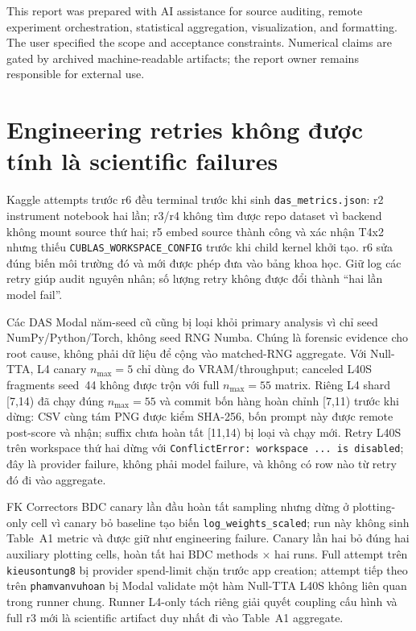 \documentclass[11pt,a4paper]{article}
\newcommand{\code}[1]{\texttt{#1}}
\begin{document}
This report was prepared with AI assistance for source auditing, remote experiment orchestration, statistical aggregation, visualization, and formatting. The user specified the scope and acceptance constraints. Numerical claims are gated by archived machine-readable artifacts; the report owner remains responsible for external use.

\appendix
\section{Engineering retries không được tính là scientific failures}

Kaggle attempts trước r6 đều terminal trước khi sinh \code{das\_metrics.json}: r2 instrument notebook hai lần; r3/r4 không tìm được repo dataset vì backend không mount source thứ hai; r5 embed source thành công và xác nhận T4x2 nhưng thiếu \code{CUBLAS\_WORKSPACE\_CONFIG} trước khi child kernel khởi tạo. r6 sửa đúng biến môi trường đó và mới được phép đưa vào bảng khoa học. Giữ log các retry giúp audit nguyên nhân; số lượng retry không được đổi thành ``hai lần model fail''.

Các DAS Modal năm-seed cũ cũng bị loại khỏi primary analysis vì chỉ seed NumPy/Python/Torch, không seed RNG Numba. Chúng là forensic evidence cho root cause, không phải dữ liệu để cộng vào matched-RNG aggregate. Với Null-TTA, L4 canary $n_{\max}=5$ chỉ dùng đo VRAM/throughput; canceled L40S fragments seed~44 không được trộn với full $n_{\max}=55$ matrix. Riêng L4 shard [7,14) đã chạy đúng $n_{\max}=55$ và commit bốn hàng hoàn chỉnh [7,11) trước khi dừng: CSV cùng tám PNG được kiểm SHA-256, bốn prompt này được remote post-score và nhận; suffix chưa hoàn tất [11,14) bị loại và chạy mới. Retry L40S trên workspace thứ hai dừng với \code{ConflictError: workspace ... is disabled}; đây là provider failure, không phải model failure, và không có row nào từ retry đó đi vào aggregate.

FK Correctors BDC canary lần đầu hoàn tất sampling nhưng dừng ở plotting-only cell vì canary bỏ baseline tạo biến \code{log\_weights\_scaled}; run này không sinh Table~A1 metric và được giữ như engineering failure. Canary lần hai bỏ đúng hai auxiliary plotting cells, hoàn tất hai BDC methods $\times$ hai runs. Full attempt trên \code{kieusontung8} bị provider spend-limit chặn trước app creation; attempt tiếp theo trên \code{phamvanvuhoan} bị Modal validate một hàm Null-TTA L40S không liên quan trong runner chung. Runner L4-only tách riêng giải quyết coupling cấu hình và full r3 mới là scientific artifact duy nhất đi vào Table~A1 aggregate.
\end{document}

